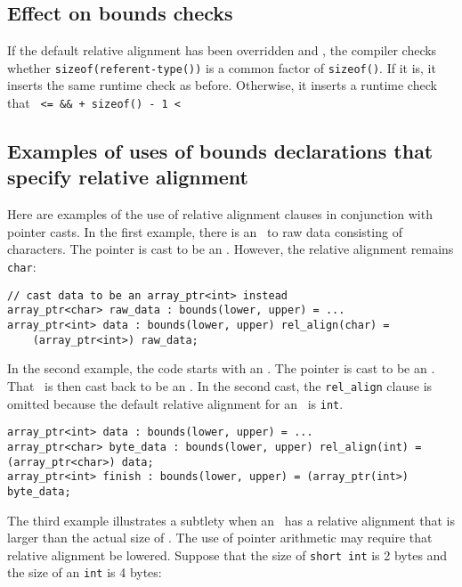 \subsection{Effect on bounds checks}

If the default relative alignment has been overridden and
, the compiler checks whether
\texttt{sizeof(referent-type())} is a common factor of \texttt{sizeof()}. 
If it is, it inserts the same
runtime check as before. Otherwise, it inserts a runtime check that
\texttt{ <=  \&\&  + sizeof() - 1 < }

\subsection{Examples of uses of bounds declarations that specify relative alignment}

Here are examples of the use of relative alignment clauses in
conjunction with pointer casts. In the first example, there is an
\arrayptr\ to raw data consisting of characters. The pointer is
cast to be an \arrayptrint . However,
the relative alignment remains \texttt{char}:

\begin{lstlisting}
// cast data to be an array_ptr<int> instead
array_ptr<char> raw_data : bounds(lower, upper) = ...
array_ptr<int> data : bounds(lower, upper) rel_align(char) =
    (array_ptr<int>) raw_data;
\end{lstlisting}

In the second example, the code starts with an
\arrayptrint. The pointer is cast to
be an \arrayptrchar. That
\arrayptr\ is then cast back to be an
\arrayptrint . In the second cast, the
\texttt{rel\_align} clause is omitted because the default relative
alignment for an \arrayptrint\ is
\texttt{int}.

\begin{lstlisting}
array_ptr<int> data : bounds(lower, upper) = ...
array_ptr<char> byte_data : bounds(lower, upper) rel_align(int) = (array_ptr<char>) data;
array_ptr<int> finish : bounds(lower, upper) = (array_ptr(int>) byte_data;
\end{lstlisting}

The third example illustrates a subtlety when an
\arrayptrT\ has a
relative alignment that is larger than the actual size of . The
use of pointer arithmetic may require that relative alignment be
lowered. Suppose that the size of \texttt{short int} is 2 bytes and the
size of an \texttt{int} is 4 bytes:


